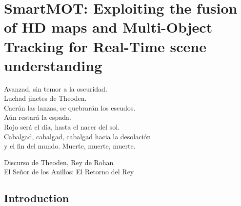 % 
% 
% 
% 
% 
% 
% 

\chapter{SmartMOT: Exploiting the fusion of HD maps and Multi-Object Tracking for Real-Time scene understanding}
\label{cha:smartmot_exploiting_the_fusion_of_hdmaps_and_mot}

\begin{FraseCelebre}
	\begin{Frase}
		Avanzad, sin temor a la oscuridad. \\
		Luchad jinetes de Theoden. \\
		Caerán las lanzas, se quebrarán los escudos. \\
		Aún restará la espada. \\
		Rojo será el día, hasta el nacer del sol. \\
		Cabalgad, cabalgad, cabalgad hacia la desolación \\ 
		y el fin del mundo. Muerte, muerte, muerte.
	\end{Frase}
	\begin{Fuente}
		Discurso de Theoden, Rey de Rohan \\
		El Señor de los Anillos: El Retorno del Rey
	\end{Fuente}
\end{FraseCelebre}

\section{Introduction}
\label{sec:4_introduction}

